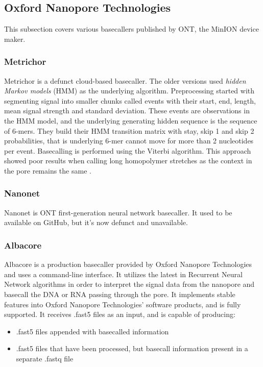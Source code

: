 \documentclass[times, utf8, diplomski, english]{fer}
\begin{document}
\subsection{Oxford Nanopore Technologies}
This subsection covers various basecallers published by ONT, the MinION device maker.
\subsubsection{Metrichor}

Metrichor is a defunct cloud-based basecaller. The older versions used \textit{hidden Markov models} (HMM) as the underlying algorithm. Preprocessing started with segmenting signal into smaller chunks called events with their start, end, length, mean signal strength and standard deviation. These events are observations in the HMM model, and the underlying generating hidden sequence is the sequence of 6-mers. They build their HMM transition matrix with stay, skip 1 and skip 2 probabilities, that is underlying 6-mer cannot move for more than 2 nucleotides per event. Basecalling is performed using the Viterbi algorithm. This approach showed poor results when calling long homopolymer stretches as the context in the pore remains the same \cite{homopolymers}\cite{homopolimeri_analiza}.

\subsubsection{Nanonet}
Nanonet is ONT first-generation neural network basecaller. It used to be available on GitHub, but it's now defunct and unavailable.

\subsubsection{Albacore}
Albacore is a production basecaller provided by Oxford Nanopore Technologies and uses a command-line interface. It
utilizes the latest in Recurrent Neural Network algorithms in order to interpret the signal data from the
nanopore and basecall the DNA or RNA passing through the pore. It implements stable features into
Oxford Nanopore Technologies’ software products, and is fully supported. It receives .fast5 files as an
input, and is capable of producing: 
\begin{itemize}
    \item .fast5 files appended with basecalled information
    \item .fast5 files that have been processed, but basecall information present in a separate .fastq file
\end{itemize}
\end{document}
